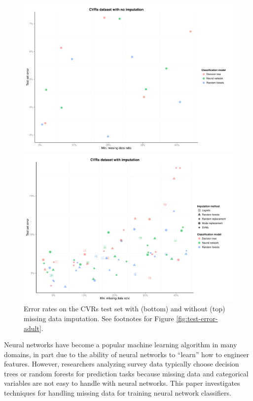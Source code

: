 \documentclass[10pt]{book}
\theoremstyle{definition}
\begin{document}
\begin{figure}[h!]
\includegraphics [scale=0.45]{figure/test-errors-votes-no-imp.pdf}\par
\includegraphics [scale=0.45]{figure/test-errors-votes-imp.pdf}\par
   \caption{\footnotesize Error rates on the CVRs test set with (bottom) and without (top) missing data imputation. See footnotes for Figure \ref{fig:test-error-adult}.}
   \label{fig:test-error-votes}
\end{figure}

\par

\setcounter{chapter}{4}
\setcounter{equation}{0} %

Neural networks have become a popular machine learning algorithm in many domains, in part due to the ability of neural networks to ``learn'' how to engineer features.  However, researchers analyzing survey data typically choose decision trees or random forests for prediction tasks because missing data and categorical variables are not easy to handle with neural networks. This paper investigates techniques for handling missing data for training neural network classifiers. 
\end{document}
